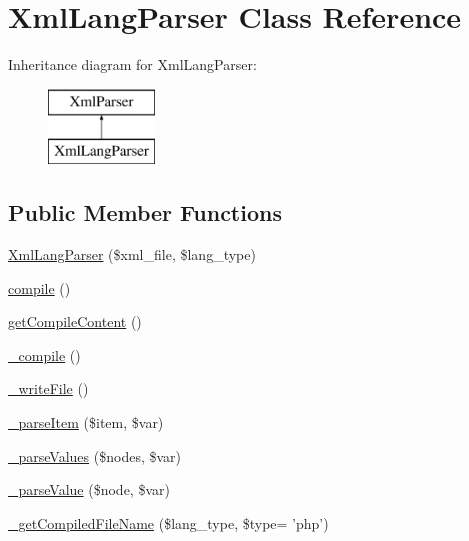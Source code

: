 \hypertarget{classXmlLangParser}{\section{Xml\+Lang\+Parser Class Reference}
\label{classXmlLangParser}
}
Inheritance diagram for Xml\+Lang\+Parser\+:\begin{figure}[H]
\begin{center}
\leavevmode
\includegraphics[height=2.000000cm]{classXmlLangParser}
\end{center}
\end{figure}
\subsection*{Public Member Functions}
\begin{DoxyCompactItemize}
\item 
\hyperlink{classXmlLangParser_a50fff41b01cd305204a85b48702a4e6f}{Xml\+Lang\+Parser} (\$xml\+\_\+file, \$lang\+\_\+type)
\item 
\hyperlink{classXmlLangParser_af0ffe6cf9e15d7af2ca16d5d9b7d5da1}{compile} ()
\item 
\hyperlink{classXmlLangParser_ab022a8d8d0717fbf4c8a171eaf6a54d2}{get\+Compile\+Content} ()
\item 
\hyperlink{classXmlLangParser_a6a27a9fbdd65d3ea3249120f8eb7d9c2}{\+\_\+compile} ()
\item 
\hyperlink{classXmlLangParser_ab49d81ff3d154da6c5d92f0367d33ec9}{\+\_\+write\+File} ()
\item 
\hyperlink{classXmlLangParser_a87379004e371e1812094e2bf802b274c}{\+\_\+parse\+Item} (\$item, \$var)
\item 
\hyperlink{classXmlLangParser_ac5ab3f7e29a914802e1b6144e6e8bcc5}{\+\_\+parse\+Values} (\$nodes, \$var)
\item 
\hyperlink{classXmlLangParser_a45b4e9645eb03c7ff7bdbda239148867}{\+\_\+parse\+Value} (\$node, \$var)
\item 
\hyperlink{classXmlLangParser_ab5049af4a722b0c2f7d8eed3c8c4dac0}{\+\_\+get\+Compiled\+File\+Name} (\$lang\+\_\+type, \$type= 'php')
\end{DoxyCompactItemize}
